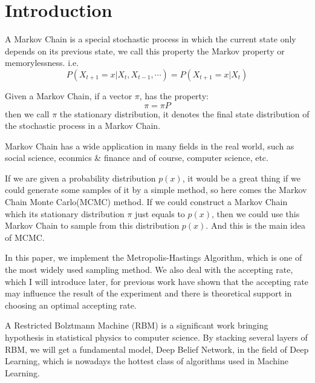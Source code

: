 


\section{Introduction} \label{sec:introduction}

A Markov Chain is a special stochastic process in which the current state only depends on its previous state, we call this property the Markov property or memorylessness. i.e.
\begin{equation}
P(X_{t+1}=x|X_t, X_{t-1}, \cdots) =P(X_{t+1}=x|X_t)
\end{equation}

Given a Markov Chain, if a vector $\pi$, has the property:
\begin{equation}
\pi=\pi P
\end{equation}
then we call $\pi$ the stationary distribution, it denotes the final state distribution of the stochastic process in a Markov Chain.

Markov Chain has a wide application in many fields in the real world, such as social science\cite{acemoglu2011political}, econmics \& finance\cite{hamilton1989new} and of course, computer science\cite{page1999pagerank}, etc.

If we are given a probability distribution $p(x)$, it would be a great thing if we could generate some samples of it by a simple method, so here comes the Markov Chain Monte Carlo(MCMC) method. If we could construct a Markov Chain which its stationary distribution $\pi$ just equals to $p(x)$, then we could use this Markov Chain to sample from this distribution $p(x)$. And this is the main idea of MCMC.

In this paper, we implement the Metropolis-Hastings Algorithm, which is one of the most widely used sampling method. We also deal with the accepting rate, which I will introduce later, for previous work\cite{roberts1997weak} have shown that the accepting rate may influence the result of the experiment and there is theoretical support in choosing an optimal accepting rate.

A Restricted Bolztmann Machine (RBM)\cite{mcclelland1987parallel} is a significant work bringing hypothesis in statistical physics to computer science. By stacking several layers of RBM, we will get a fundamental model, Deep Belief Network\cite{hinton2006reducing}, in the field of Deep Learning, which is nowadays the hottest class of algorithms used in Machine Learning.

